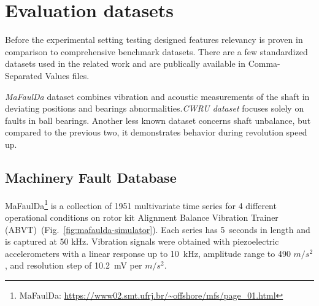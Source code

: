 \section{Evaluation datasets}
Before the experimental setting testing designed features relevancy is proven in comparison to comprehensive benchmark datasets. There are a few standardized datasets used in the related work \cite{ribeiro_rotating_2017} and are publically available in Comma-Separated Values files. 

\emph{MaFaulDa} dataset combines vibration and acoustic measurements of the shaft in deviating positions and bearings abnormalities.\emph{CWRU dataset} focuses solely on faults in ball bearings. Another less known dataset concerns shaft unbalance, but compared to the previous two, it demonstrates behavior during revolution speed up.  

\subsection{Machinery Fault Database}
MaFaulDa\footnote{MaFaulDa: \url{https://www02.smt.ufrj.br/~offshore/mfs/page_01.html}} is a collection of 1951 multivariate time series for 4 different operational conditions on rotor kit Alignment Balance Vibration Trainer (ABVT)~(Fig.~\ref{fig:mafaulda-simulator}). Each series has 5~seconds in length and is captured at 50 kHz. Vibration signals were obtained with piezoelectric accelerometers with a linear response up to 10~kHz, amplitude range to 490 $m/s^2$, and resolution step of 10.2~mV per $m/s^2$. 

